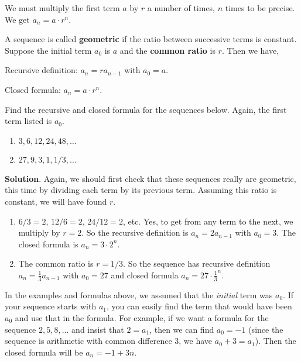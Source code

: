 \documentclass[11pt,]{book}
\newcommand{\terminology}[1]{\textbf{#1}}
\theoremstyle{ptxplainnotitle}
\theoremstyle{ptxplaintitle}
\theoremstyle{ptxdefinitionnotitle}
\theoremstyle{ptxdefinitiontitle}
\theoremstyle{ptxdefinitionnotitle}
\theoremstyle{ptxdefinitiontitle}
\theoremstyle{ptxdefinitionnotitle}
\theoremstyle{ptxdefinitiontitle}
\theoremstyle{ptxdefinitiontitlenonumber}
\theoremstyle{ptxdefinitiontitlenonumber}
\numberwithin{equation}{chapter}
\begin{document}
We must multiply the first term \(a\) by \(r\) a number of times, \(n\) times to be precise. We get \(a_n = a\cdot r^{n}\).%
\begin{assemblage}\label{assemblage-4}
\hypertarget{p-171}{}%
A sequence is called \terminology{geometric} if the ratio between successive terms is constant. Suppose the initial term \(a_0\) is \(a\) and the \terminology{common ratio} is \(r\). Then we have,%
\par
\hypertarget{p-172}{}%
Recursive definition: \(a_n = ra_{n-1}\) with \(a_0 = a\).%
\par
\hypertarget{p-173}{}%
Closed formula: \(a_n = a\cdot r^{n}\).%
\end{assemblage}
\begin{example}\label{example-6}
\hypertarget{p-174}{}%
Find the recursive and closed formula for the sequences below. Again, the first term listed is \(a_0\). \leavevmode%
\begin{enumerate}
\item\hypertarget{li-112}{}\(3, 6, 12, 24, 48, \ldots\)%
\item\hypertarget{li-113}{}\(27, 9, 3, 1, 1/3, \ldots\)%
\end{enumerate}
%
\par\smallskip%
\noindent\textbf{Solution}.\hypertarget{solution-14}{}\quad%
\hypertarget{p-175}{}%
Again, we should first check that these sequences really are geometric, this time by dividing each term by its previous term.  Assuming this ratio is constant, we will have found \(r\). \leavevmode%
\begin{enumerate}
\item\hypertarget{li-114}{}\(6/3 = 2\), \(12/6 = 2\), \(24/12 = 2\), etc. Yes, to get from any term to the next, we multiply by \(r = 2\). So the recursive definition is \(a_n = 2a_{n-1}\) with \(a_0 = 3\). The closed formula is \(a_n = 3\cdot 2^{n}\).%
\item\hypertarget{li-115}{}\hypertarget{p-176}{}%
The common ratio is \(r = 1/3\). So the sequence has recursive definition \(a_n = \frac{1}{3}a_{n-1}\) with \(a_0 = 27\) and closed formula \(a_n = 27\cdot \frac{1}{3}^{n}\).%
\end{enumerate}
%
\end{example}
\hypertarget{p-177}{}%
In the examples and formulas above, we assumed that the \emph{initial} term was \(a_0\). If your sequence starts with \(a_1\), you can easily find the term that would have been \(a_0\) and use that in the formula. For example, if we want a formula for the sequence \(2, 5, 8,\ldots\) and insist that \(2= a_1\), then we can find \(a_0 = -1\) (since the sequence is arithmetic with common difference 3, we have \(a_0 + 3 = a_1\)). Then the closed formula will be \(a_n = -1 + 3n\).%
\end{document}
